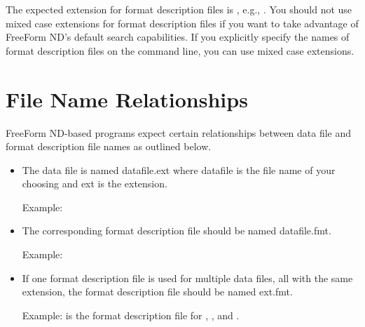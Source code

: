 The expected extension for format description files is , e.g.,
. You should not use mixed case extensions for format
description files if you want to take advantage of FreeForm ND's
default search capabilities. If you explicitly specify the names of
format description files on the command line, you can use mixed case
extensions.


\section{File Name Relationships}
\label{ff,convs,relation}


FreeForm ND-based programs expect certain relationships between data
file and format description file names as outlined below.

\begin{itemize}
\item   The data file is named datafile.ext where datafile is the file
  name of your choosing and ext is the extension.
  
  Example: 
  
\item   The corresponding format description file should be named
  datafile.fmt.
  
  Example: 
  
\item   If one format description file is used for multiple data
  files, all with the same extension, the format description file
  should be named ext.fmt.
  
  Example:  is the format description file for ,
  , and .
\end{itemize}

